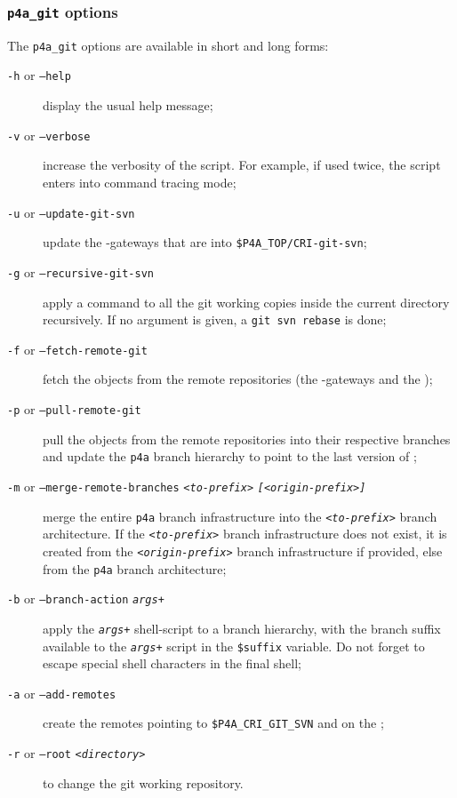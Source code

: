 \documentclass[a4paper]{article}
\begin{document}
\subsubsection{\protect\texttt{p4a\_git} options}
\label{sec:p4a_git-options}

The \verb|p4a_git| options are available in short and long forms:
\begin{description}
\item[\texttt{-h} or \texttt{--help}] display the usual help message;
\item[\texttt{-v} or \texttt{--verbose}] increase the verbosity of the
  script. For example, if used twice, the script enters into command
  tracing mode;
\item[\texttt{-u} or \texttt{--update-git-svn}] update the \Apips{}
  \Agit-\Asvn gateways that are into \verb|$P4A_TOP/CRI-git-svn|;%
\item[\texttt{-g} or \texttt{--recursive-git-svn}] apply a \Agit command
  to all the git working copies inside the current directory
  recursively. If no argument is given, a \texttt{git svn rebase} is done;
\item[\texttt{-f} or \texttt{--fetch-remote-git}] fetch the objects from
  the remote \Agit repositories (the \Apips{} \Agit-\Asvn gateways and the
  \Apolylib{} \Agit);
\item[\texttt{-p} or \texttt{--pull-remote-git}] pull the objects from the
  remote \Agit repositories into their respective branches and update the
  \texttt{p4a} branch hierarchy to point to the last version of \Apfa;
\item[\texttt{-m} or \texttt{--merge-remote-branches}
  \texttt{\emph{<to-prefix>}} \texttt{\emph{[<origin-prefix>]}}] merge
  the entire
  \texttt{p4a} branch infrastructure into the
  \texttt{\emph{<to-prefix>}} branch architecture. If the
  \texttt{\emph{<to-prefix>}} branch infrastructure does not exist, it is
  created from the \texttt{\emph{<origin-prefix>}} branch infrastructure
  if provided, else from the \texttt{p4a} branch architecture;
\item[\texttt{-b} or \texttt{--branch-action} \texttt{\emph{args+}}] apply
  the \texttt{\emph{args+}} shell-script to a branch hierarchy, with the
  branch suffix available to the \texttt{\emph{args+}} script in the
  \verb|$suffix| variable. Do not forget to escape special shell
  characters in the final shell;
\item[\texttt{-a} or \texttt{--add-remotes}] create the remotes pointing
  to \verb|$P4A_CRI_GIT_SVN| and on the \Apolylib{} \Agit;
\item[\texttt{-r} or \texttt{--root} \texttt{<\emph{directory}>}] to
  change the git working repository.
\end{description}
\end{document}
